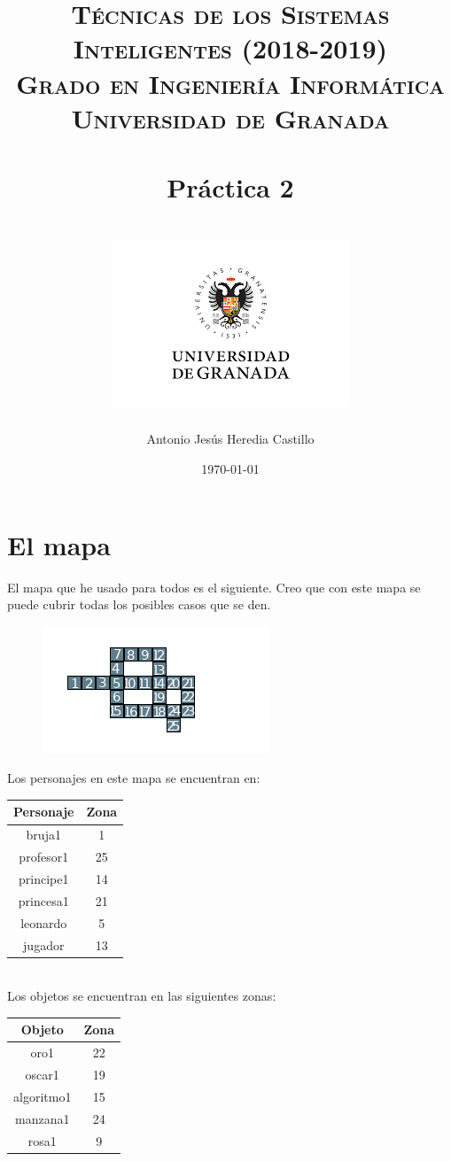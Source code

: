 \documentclass[12pt,a4paper]{article}
\title{
\normalfont \normalsize 
\textsc{{\bf Técnicas de los Sistemas Inteligentes (2018-2019)} \\ Grado en Ingeniería Informática \\ Universidad de Granada} \\ [25pt] %
\horrule{0.5pt} \\[0.4cm] %
\huge Práctica 2 \\ %
\horrule{2pt} \\[0.5cm] %
\includegraphics{images/logo.png}	
}
\author{Antonio Jesús Heredia Castillo} %
\date{\normalsize\today} %
\begin{document}
\maketitle %
\newpage %
\tableofcontents %
\listoffigures
\newpage
\section{El mapa}
El mapa que he usado para todos es el siguiente. Creo que con este mapa se puede cubrir todas los posibles casos que se den.
\begin{figure}[H]
	\centering
	\includegraphics{images/mapa}
	\caption{}
	\label{fig:mapa}
\end{figure}
Los personajes en este mapa se encuentran en:\\
\begin{tabular}{|c|c|}
	\hline 
	Personaje & Zona \\ 
	\hline 
	bruja1 & 1 \\ 
	\hline 
	profesor1 & 25 \\ 
	\hline 
	principe1 & 14 \\ 
	\hline 
	princesa1 & 21 \\ 
	\hline 
	leonardo & 5 \\ 
	\hline 
	jugador & 13 \\ 
	\hline 
\end{tabular}\\
Los objetos se encuentran en las siguientes zonas: \\
\begin{tabular}{|c|c|}
	\hline 
	\rule[-1ex]{0pt}{2.5ex} Objeto & Zona \\ 
	\hline 
	\rule[-1ex]{0pt}{2.5ex} oro1 & 22 \\ 
	\hline 
	\rule[-1ex]{0pt}{2.5ex} oscar1 & 19 \\ 
	\hline 
	\rule[-1ex]{0pt}{2.5ex} algoritmo1 & 15 \\ 
	\hline 
	\rule[-1ex]{0pt}{2.5ex} manzana1 & 24 \\ 
	\hline 
	\rule[-1ex]{0pt}{2.5ex} rosa1 & 9 \\ 
	\hline 
\end{tabular} 
\end{document}
